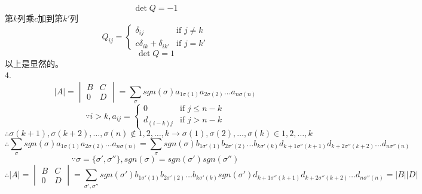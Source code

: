 \documentclass{ctexart}
\begin{document}
\[\det Q=-1\]
第$k$列乘$c$加到第$k'$列
\[Q_{ij}=\begin{cases}
	\delta_{ij}&\text{if } j\neq k\\
	c\delta_{ik}+\delta_{ik'}&\text{if } j=k'
\end{cases}\]
\[\det Q=1\]
以上是显然的。\\
4.\\
\[|A|=\begin{vmatrix}
	B&C\\
	0&D
\end{vmatrix}
=\sum\limits_\sigma sgn(\sigma)a_{1\sigma(1)}a_{2\sigma(2)}\dots a_{n\sigma(n)}\]
\[\because i>k,a_{ij}=\begin{cases}
	0&\text{if } j\le n-k\\
	d_{(i-k)j}&\text{if }j>n-k
\end{cases}\]
\[\therefore\sigma(k+1),\sigma(k+2),\dots,\sigma(n)\notin 1,2,\dots,k\rightarrow\sigma(1),\sigma(2),\dots,\sigma(k)\in1,2,\dots,k\]
\[\therefore\sum\limits_\sigma sgn(\sigma)a_{1\sigma(1)}a_{2\sigma(2)}\dots a_{n\sigma(n)}=\sum\limits_\sigma sgn(\sigma)b_{1\sigma'(1)}b_{2\sigma'(2)}\dots b_{k\sigma'(k)}d_{k+1\sigma''(k+1)}d_{k+2\sigma''(k+2)}\dots d_{n\sigma''(n)}\]
\[\because\sigma=\{\sigma',\sigma''\},sgn(\sigma)=sgn(\sigma')sgn(\sigma'')\]
\[\therefore|A|=\begin{vmatrix}
	B&C\\
	0&D
\end{vmatrix}
=\sum\limits_{\sigma',\sigma''} sgn(\sigma')b_{1\sigma'(1)}b_{2\sigma'(2)}\dots b_{k\sigma'(k)}sgn(\sigma')d_{k+1\sigma''(k+1)}d_{k+2\sigma''(k+2)}\dots d_{n\sigma''(n)}
=|B||D|\]
\end{document}
